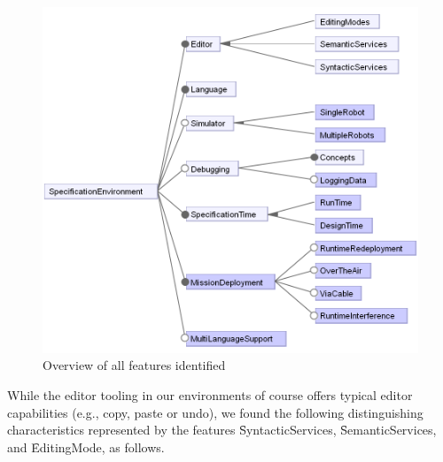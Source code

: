 \begin{figure}[t]
     \centering
    \includegraphics[width=\columnwidth]{fig/toplevelfeatures.png}
			\vspace{-.3cm}
      \caption{Overview of all features identified%
      }
      \label{fig:featuremodel}
			\vspace{-.4cm}
\end{figure}

\newcommand{\fsyntacticservices}{\f{SyntacticServices}}
\newcommand{\fsemanticservices}{\f{SemanticServices}}
\newcommand{\feditingmode}{\f{EditingMode}}

 While the editor tooling in our environments of course offers typical editor capabilities (e.g., copy, paste or undo), we found the following distinguishing characteristics represented by the features \fsyntacticservices, \fsemanticservices, and \feditingmode, as follows.


